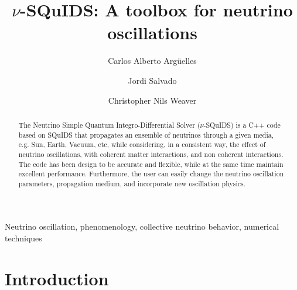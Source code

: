\documentclass[3p,12pt]{elsarticle}
\begin{document}
\begin{frontmatter}

\title{$\nu$-SQuIDS: A toolbox for neutrino oscillations}

\author[MIT]{Carlos Alberto Arg\"uelles}
\author[ific]{Jordi Salvado}
\author[UA]{Christopher Nils Weaver}
\address[MIT]{Massachusetts Institute of Technology, Cambridge, MA 02139, USA}
\address[UA]{Dept.~of Physics, University of Alberta, Edmonton,
  Alberta, Canada T6G 2E1} 
\address[ific]{Instituto de F\'isica Corpuscular, Universidad de
  Valencia CSIC, Valencia 46071, Spain}


\begin{abstract}
The Neutrino Simple Quantum Integro-Differential Solver ($\nu$-SQuIDS) is a C++ code based on SQuIDS that propagates an ensemble of neutrinos through a given media, e.g. Sun, Earth, Vacuum, etc, while considering, in a consistent way, the effect of neutrino oscillations, with coherent matter interactions, and non coherent interactions. The code has been design to be accurate and flexible, while at the same time maintain excellent performance. Furthermore, the user can easily change the neutrino oscillation parameters, propagation medium, and incorporate new oscillation physics. 
\end{abstract}

\begin{keyword}
Neutrino oscillation, phenomenology, collective neutrino behavior, numerical techniques
\end{keyword}

\end{frontmatter}

\hypersetup{linkcolor=black}
\tableofcontents
\hypersetup{linkcolor=blue}
\newpage
\section{Introduction}
\label{sec:intro} 
\end{document}
